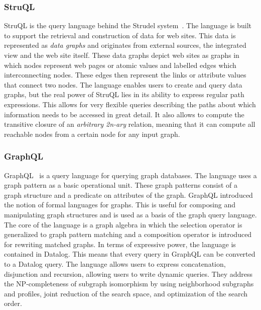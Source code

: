 \subsubsection*{StruQL}

StruQL is the query language behind the Strudel system~\cite{Fernandez97aquery}. The language is built to support the retrieval and construction of data for web sites. This data is represented as \textit{data graphs} and originates from external sources, the integrated view and the web site itself. These data graphs depict web sites as graphs in which nodes represent web pages or atomic values and labelled edges which interconnecting nodes. These edges then represent the links or attribute values that connect two nodes. The language enables users to create and query data graphs, but the real power of StruQL lies in its ability to express regular path expressions. This allows for very flexible queries describing the paths about which information needs to be accessed in great detail.
It also allows to compute the transitive closure of an \textit{arbitrary 2n-ary} relation, meaning that it can compute all reachable nodes from a certain node for any input graph. 

\subsubsection*{GraphQL}

GraphQL~\cite{He:2008} is a query language for querying graph databases. The language uses a graph pattern as a basic operational unit. These graph patterns consist of a graph structure and a predicate on attributes of the graph. GraphQL introduced the notion of formal languages for graphs. This is useful for composing and manipulating graph structures and is used as a basis of the graph query language.
The core of the language is a graph algebra in which the selection operator is generalized to graph pattern matching and a composition operator is introduced for rewriting matched graphs. In terms of expressive power, the language is contained in Datalog. This means that every query in GraphQL can be converted to a Datalog query. The language allows users to express concatenation, disjunction and recursion, allowing users to write dynamic queries. They address the NP-completeness of subgraph isomorphism by using neighborhood subgraphs and profiles, joint reduction of the search space, and optimization of the search order.

